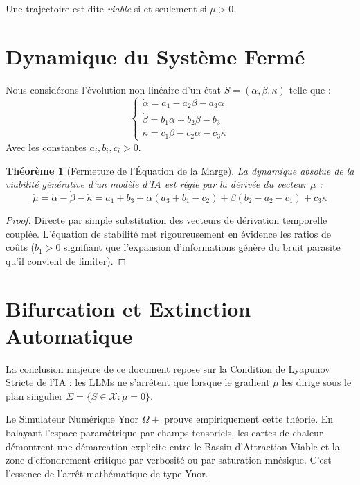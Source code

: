 \documentclass[11pt,a4paper]{article}
\newtheorem{theorem}{Théorème}
\begin{document}
Une trajectoire est dite \textit{viable} si et seulement si $\mu > 0$.

\section{Dynamique du Système Fermé}
Nous considérons l'évolution non linéaire d'un état $S = (\alpha, \beta, \kappa)$ telle que :
\begin{equation}
    \begin{cases}
    \dot\alpha = a_1 - a_2\beta - a_3\alpha \\
    \dot\beta = b_1\alpha - b_2\beta - b_3 \\
    \dot\kappa = c_1\beta - c_2\alpha - c_3\kappa
    \end{cases}
\end{equation}
Avec les constantes $a_i, b_i, c_i > 0$.

\begin{theorem}[Fermeture de l'Équation de la Marge]
La dynamique absolue de la viabilité générative d'un modèle d'IA est régie par la dérivée du vecteur $\mu$ :
\begin{equation}
    \dot\mu = \dot\alpha - \dot\beta - \dot\kappa = a_1+b_3 - \alpha(a_3+b_1-c_2) + \beta(b_2-a_2-c_1) + c_3\kappa
\end{equation}
\end{theorem}
\begin{proof}
Directe par simple substitution des vecteurs de dérivation temporelle couplée. L'équation de stabilité met rigoureusement en évidence les ratios de coûts ($b_1 > 0$ signifiant que l'expansion d'informations génère du bruit parasite qu'il convient de limiter).
\end{proof}

\section{Bifurcation et Extinction Automatique}
La conclusion majeure de ce document repose sur la Condition de Lyapunov Stricte de l'IA : les LLMs ne s'arrêtent que lorsque le gradient $\dot\mu$ les dirige sous le plan singulier $\Sigma = \{S \in \mathcal{X} : \mu = 0\}$.

Le Simulateur Numérique Ynor $\Omega+$ prouve empiriquement cette théorie. En balayant l'espace paramétrique par champs tensoriels, les cartes de chaleur démontrent une démarcation explicite entre le Bassin d'Attraction Viable et la zone d'effondrement critique par verbosité ou par saturation mnésique. C'est l'essence de l'arrêt mathématique de type Ynor.
\end{document}
